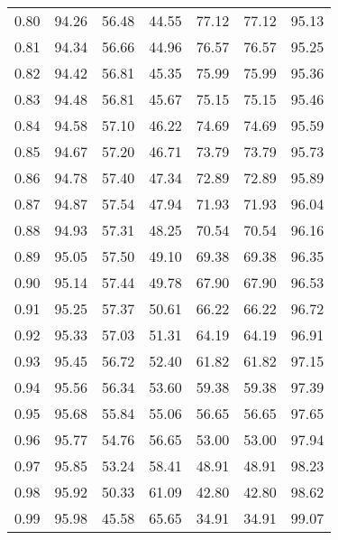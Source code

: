 \begin{tabular}{|c|c|c|c|c|c|c|}
      0.80 &     94.26 &     56.48 &      44.55 &   77.12 &      77.12 &         95.13 \\
      0.81 &     94.34 &     56.66 &      44.96 &   76.57 &      76.57 &         95.25 \\
      0.82 &     94.42 &     56.81 &      45.35 &   75.99 &      75.99 &         95.36 \\
      0.83 &     94.48 &     56.81 &      45.67 &   75.15 &      75.15 &         95.46 \\
      0.84 &     94.58 &     57.10 &      46.22 &   74.69 &      74.69 &         95.59 \\
      0.85 &     94.67 &     57.20 &      46.71 &   73.79 &      73.79 &         95.73 \\
      0.86 &     94.78 &     57.40 &      47.34 &   72.89 &      72.89 &         95.89 \\
      0.87 &     94.87 &     57.54 &      47.94 &   71.93 &      71.93 &         96.04 \\
      0.88 &     94.93 &     57.31 &      48.25 &   70.54 &      70.54 &         96.16 \\
      0.89 &     95.05 &     57.50 &      49.10 &   69.38 &      69.38 &         96.35 \\
      0.90 &     95.14 &     57.44 &      49.78 &   67.90 &      67.90 &         96.53 \\
      0.91 &     95.25 &     57.37 &      50.61 &   66.22 &      66.22 &         96.72 \\
      0.92 &     95.33 &     57.03 &      51.31 &   64.19 &      64.19 &         96.91 \\
      0.93 &     95.45 &     56.72 &      52.40 &   61.82 &      61.82 &         97.15 \\
      0.94 &     95.56 &     56.34 &      53.60 &   59.38 &      59.38 &         97.39 \\
      0.95 &     95.68 &     55.84 &      55.06 &   56.65 &      56.65 &         97.65 \\
      0.96 &     95.77 &     54.76 &      56.65 &   53.00 &      53.00 &         97.94 \\
      0.97 &     95.85 &     53.24 &      58.41 &   48.91 &      48.91 &         98.23 \\
      0.98 &     95.92 &     50.33 &      61.09 &   42.80 &      42.80 &         98.62 \\
      0.99 &     95.98 &     45.58 &      65.65 &   34.91 &      34.91 &         99.07 \\
\bottomrule
\end{tabular}

